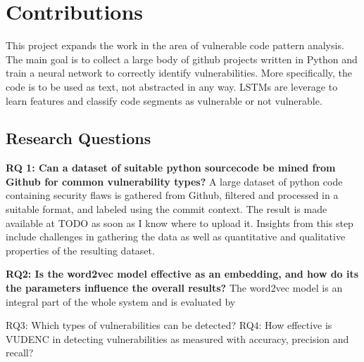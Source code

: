 \documentclass[
	a4paper,
	pagesize,
	pdftex,
	12pt,
	twoside, %
	BCOR=5mm, %
	ngerman,
	fleqn,
	final,
	]{scrartcl}
\begin{document}
\section{Contributions}

This project expands the work in the area of vulnerable code pattern analysis. The main goal is to collect a large body of github projects written in Python and train a neural network to correctly identify vulnerabilities. More specifically, the code is to be used as text, not abstracted in any way. LSTMs are leverage to learn features and classify code segments as vulnerable or not vulnerable. 

\subsection{Research Questions}

\textbf{RQ 1: Can a dataset of suitable python sourcecode be mined from Github for common vulnerability types?}
A large dataset of python code containing security flaws is gathered from Github, filtered and processed in a suitable format, and labeled using the commit context. The result is made available at TODO as soon as I know where to upload it. Insights from this step include challenges in gathering the data as well as quantitative and qualitative properties of the resulting dataset.

\textbf{RQ2: Is the word2vec model effective as an embedding, and how do its the parameters influence the overall results?}
The word2vec model is an integral part of the whole system and is evaluated by 


 RQ3: Which types of vulnerabilities can be detected? RQ4: How effective is VUDENC in detecting vulnerabilities as measured with accuracy, precision and recall? 

\end{document}
